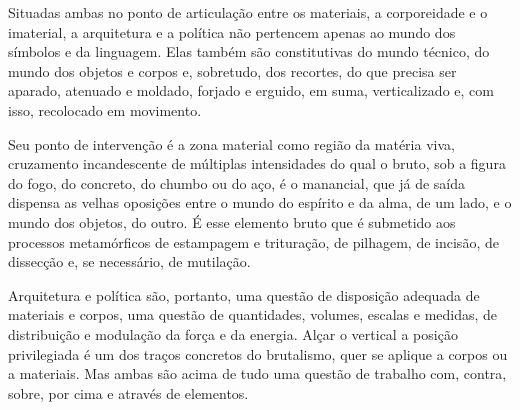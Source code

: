 \begin{multicols}{2}
Situadas ambas no ponto de articulação entre os materiais, a
corporeidade e o imaterial, a arquitetura e a política não pertencem
apenas ao mundo dos símbolos e da linguagem. Elas também são
constitutivas do mundo técnico, do mundo dos objetos e corpos e,
sobretudo, dos recortes, do que precisa ser aparado, atenuado e moldado,
forjado e erguido, em suma, verticalizado e, com isso, recolocado em
movimento. 

\vspace{\baselineskip}
{\small{}}
\vspace{\baselineskip}

Seu ponto de intervenção é a zona material como região da
matéria viva, cruzamento incandescente de múltiplas intensidades do qual
o bruto, sob a figura do fogo, do concreto, do chumbo ou do aço, é o
manancial, que já de saída dispensa as velhas oposições entre o mundo do
espírito e da alma, de um lado, e o mundo dos objetos, do outro. É esse
elemento bruto que é submetido aos processos metamórficos de estampagem
e trituração, de pilhagem, de incisão, de dissecção e, se necessário, de
mutilação.

Arquitetura e política são, portanto, uma questão de disposição adequada
de materiais e corpos, uma questão de quantidades, volumes, escalas e
medidas, de distribuição e modulação da força e da energia. Alçar o
vertical a posição privilegiada é um dos traços concretos do brutalismo,
quer se aplique a corpos ou a materiais. Mas ambas são acima de tudo uma
questão de trabalho com, contra, sobre, por cima e através de elementos.


\end{multicols}
